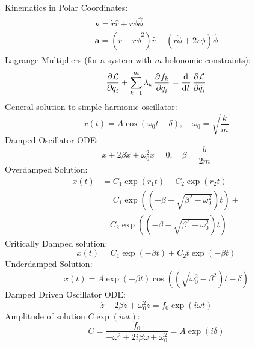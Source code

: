 \documentclass{article}
\renewcommand{\v}[1]{\ensuremath{\mathbf{#1}}} %
\renewcommand{\=}[1]{\stackrel{#1}{=}} %
\newcommand{\LL}{\mathcal{L}}
\begin{document}
	\begin{multicols}{4}
		Kinematics in Polar Coordinates:
		\begin{align}
			\begin{split}
				\v{v}=\dot{r}\hat{r}+r\dot{\phi}\hat{\phi} \\
				\v{a}=(\ddot{r}-r\dot{\phi}^2)\hat{r}+(r\ddot{\phi}+2\dot{r}\dot{\phi})\hat{\phi}
			\end{split}
		\end{align}
		Lagrange Multipliers (for a system with $m$ holonomic constraints):
		\begin{equation}
			\dpd{\LL}{q_i} + \sum_{k=1}^m\lambda_k \dpd{f_k}{q_i} = \dod{}{t}\dpd{\LL}{\dot{q}_i}
		\end{equation}
		General solution to simple harmonic oscillator:
		\begin{equation}
			x(t) = A\cos(\omega_0 t - \delta), \quad \omega_0 = \sqrt{\frac{k}{m}}
		\end{equation}
		Damped Oscillator ODE:
		\begin{equation}
			\ddot{x} + 2\beta\dot{x} + \omega_0^2x = 0, \quad \beta = \frac{b}{2m}
		\end{equation}
		Overdamped Solution:
		\begin{equation}
			\begin{split}
				x(t) &= C_1\exp(r_1t) + C_2\exp(r_2t) \\
				&= C_1\exp(\left(-\beta + \sqrt{\beta^2 - \omega_0^2}\right)t) + \\
				&\quad C_2\exp(\left(-\beta - \sqrt{\beta^2 - \omega_0^2}\right)t)
			\end{split}
		\end{equation}
		Critically Damped solution:
		\begin{equation}
			x(t) = C_1\exp(-\beta t) + C_2t\exp(-\beta t)
		\end{equation}
		Underdamped Solution:
		\begin{equation}
			x(t) = A\exp(-\beta t)\cos(\left(\sqrt{\omega_0^2 - \beta^2}\right)t - \delta)
		\end{equation}
		Damped Driven Oscillator ODE:
		\begin{equation}
			\ddot{z} + 2\beta\dot{z} + \omega_0^2z = f_0\exp(i\omega t)
		\end{equation}
		Amplitude of solution $C\exp(i\omega t)$:
		\begin{equation}
			C = \frac{f_0}{-\omega^2 + 2i\beta \omega + \omega_0^2} = A\exp(i\delta)
		\end{equation}

\end{multicols}
\end{document}
